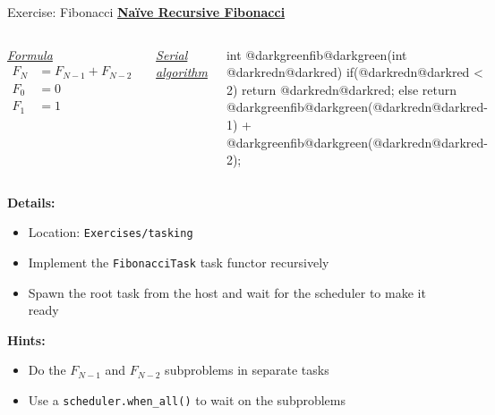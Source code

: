 \begin{frame}[fragile]{Exercise: Fibonacci}
    {\ul{\textbf{Naïve Recursive Fibonacci}}}

  \begin{columns}[t,onlytextwidth]
      \begin{center}
          \vspace{-2em}
          {\ul{\textit{Formula}}}
\begin{align*}
    F_N &= F_{N-1} + F_{N-2} \\
    F_0 &= 0 \\
    F_1 &= 1
\end{align*}
      \end{center}
      {\ul{\textit{Serial algorithm}}}
\begin{code}[keywords={}]
int @darkgreenfib@darkgreen(int @darkredn@darkred) {
  if(@darkredn@darkred < 2) return @darkredn@darkred;
  else {
    return @darkgreenfib@darkgreen(@darkredn@darkred-1) + @darkgreenfib@darkgreen(@darkredn@darkred-2);
  }
}
\end{code}
  \end{columns}

    {\textbf{Details:}}
    \begin{itemize}
        \item Location: \texttt{Exercises/tasking}
        \item Implement the \texttt{FibonacciTask} task functor recursively
        \item Spawn the root task from the host and wait for the scheduler to make it ready
    \end{itemize}
    {\textbf{Hints:}}
    \begin{itemize}
        \item Do the $F_{N-1}$ and $F_{N-2}$ subproblems in separate tasks
        \item Use a \texttt{scheduler.when\_all()} to wait on the subproblems
    \end{itemize}
\end{frame}

